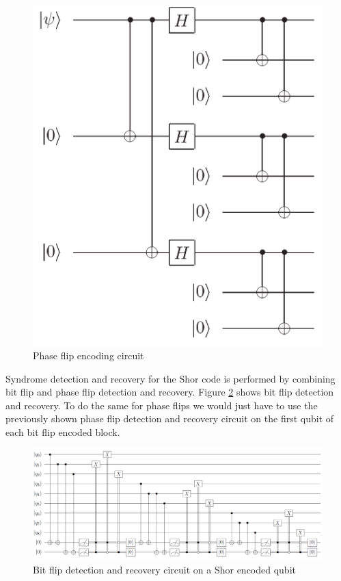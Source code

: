 \begin{figure}[h!]
    \centering
    \includegraphics[scale=.25]{images/ErrorCorrection-ShorEncodingCircuit.png}
    \caption{Phase flip encoding circuit \cite{NielsenChuang_2012}}
    \label{fig:ShorEncodingCircuit}
\end{figure}

Syndrome detection and recovery for the Shor code is performed by combining bit flip and phase flip detection and recovery. Figure \ref{fig:ShorBitFlipDetectionAndRecoveryCircuit} shows bit flip detection and recovery. To do the same for phase flips we would just have to use the previously shown phase flip detection and recovery circuit on the first qubit of each bit flip encoded block.

\begin{figure}[h!]
    \centering
    \includegraphics[scale=.35]{images/ErrorCorrection-ShorBitFlipDetectionAndRecoveryCircuit.png}
    \caption{Bit flip detection and recovery circuit on a Shor encoded qubit \cite{ThomasWong_2022}}
    \label{fig:ShorBitFlipDetectionAndRecoveryCircuit}
\end{figure}

